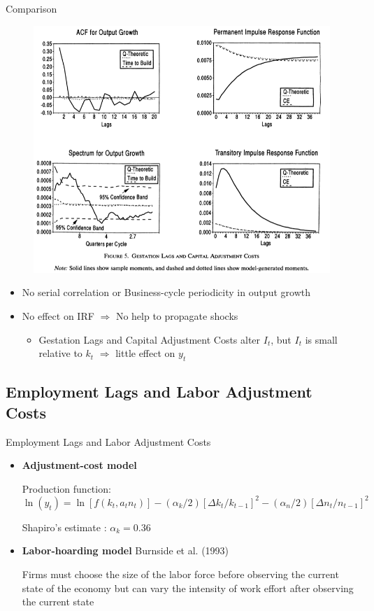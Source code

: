 \documentclass[10pt]{beamer}
\begin{document}
\begin{frame}{Comparison}
\begin{figure}
    \centering
  \includegraphics[width=0.65\linewidth]{Capital adj cost.png}
\end{figure}
\small
\begin{itemize}
    \item No serial correlation or Business-cycle periodicity in output growth
    \item No effect on IRF $\Rightarrow$ No help to propagate shocks
    \begin{itemize}
        \item Gestation Lags and Capital Adjustment Costs alter $I_t$, but $I_t$ is small relative to $k_t$ $\Rightarrow$ little effect on $y_t$
    \end{itemize}
\end{itemize}
    
\end{frame}

\subsection{Employment Lags and Labor Adjustment Costs}
\begin{frame}{Employment Lags and Labor Adjustment Costs}
\begin{itemize}
    \item \textbf{Adjustment-cost model}

Production function:
$$
\ln \left(y_t\right)= \ln \left[f\left(k_t, a_t n_t\right)\right] -\left(\alpha_{k} / 2\right)\left[\Delta k_t / k_{t-1}\right]^2 -\left(\alpha_n / 2\right)\left[\Delta n_t / n_{t-1}\right]^2
$$

Shapiro's estimate : $\alpha_{k} = 0.36$

    \item \textbf{Labor-hoarding model} Burnside et al. (1993)

    Firms must choose the size of the labor force before observing the current state of the economy but can vary the intensity of work effort after observing the current state
\end{itemize}


\end{frame}
\end{document}

